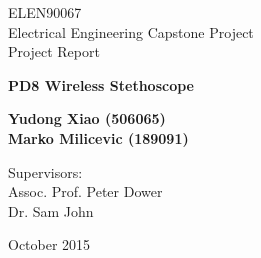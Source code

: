 \documentclass[pdftex, fontsize=11pt, a4paper]{scrbook}
\begin{document}
\begin{titlepage}
\thispagestyle{empty}

\begin{center}
ELEN90067 \\
Electrical Engineering Capstone Project \\
Project Report
\end{center}

\vspace{3cm}

\begin{center}
\Huge{ \bf  PD8 Wireless Stethoscope}
\end{center}

\vspace{1cm}

\begin{center}
\bf{ 
Yudong Xiao (506065) \\
Marko Milicevic (189091)
}
\end{center}

\vspace{2cm}
\begin{center}
Supervisors: \\
Assoc. Prof. Peter Dower \\
Dr. Sam John
\end{center}

\vspace{7cm}

\begin{center}
October 2015
\end{center}

\end{titlepage}
\end{document}
